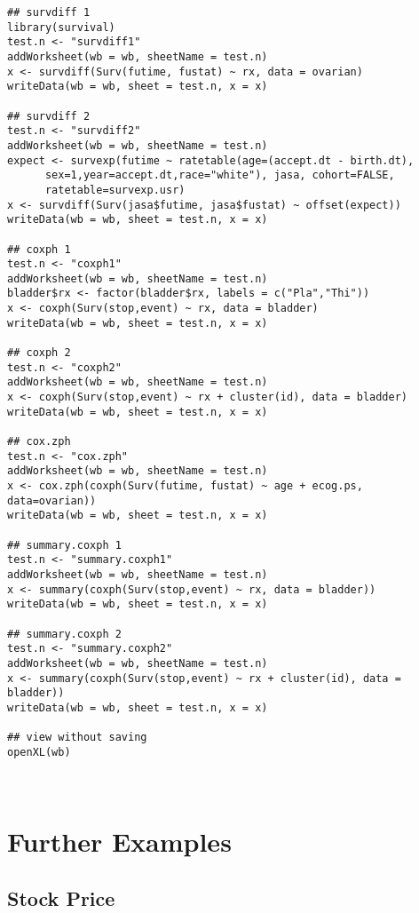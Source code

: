 \documentclass[11pt]{article}\usepackage[]{graphicx}\usepackage[]{color}
\begin{document}
\begin{verbatim}
## survdiff 1
library(survival)
test.n <- "survdiff1"
addWorksheet(wb = wb, sheetName = test.n)
x <- survdiff(Surv(futime, fustat) ~ rx, data = ovarian)
writeData(wb = wb, sheet = test.n, x = x)

## survdiff 2
test.n <- "survdiff2"
addWorksheet(wb = wb, sheetName = test.n)
expect <- survexp(futime ~ ratetable(age=(accept.dt - birth.dt),
      sex=1,year=accept.dt,race="white"), jasa, cohort=FALSE,
      ratetable=survexp.usr)
x <- survdiff(Surv(jasa$futime, jasa$fustat) ~ offset(expect))
writeData(wb = wb, sheet = test.n, x = x)

## coxph 1
test.n <- "coxph1"
addWorksheet(wb = wb, sheetName = test.n)
bladder$rx <- factor(bladder$rx, labels = c("Pla","Thi"))
x <- coxph(Surv(stop,event) ~ rx, data = bladder)
writeData(wb = wb, sheet = test.n, x = x)

## coxph 2
test.n <- "coxph2"
addWorksheet(wb = wb, sheetName = test.n)
x <- coxph(Surv(stop,event) ~ rx + cluster(id), data = bladder)
writeData(wb = wb, sheet = test.n, x = x)

## cox.zph
test.n <- "cox.zph"
addWorksheet(wb = wb, sheetName = test.n)
x <- cox.zph(coxph(Surv(futime, fustat) ~ age + ecog.ps,  data=ovarian))
writeData(wb = wb, sheet = test.n, x = x)

## summary.coxph 1
test.n <- "summary.coxph1"
addWorksheet(wb = wb, sheetName = test.n)
x <- summary(coxph(Surv(stop,event) ~ rx, data = bladder))
writeData(wb = wb, sheet = test.n, x = x)

## summary.coxph 2
test.n <- "summary.coxph2"
addWorksheet(wb = wb, sheetName = test.n)
x <- summary(coxph(Surv(stop,event) ~ rx + cluster(id), data = bladder))
writeData(wb = wb, sheet = test.n, x = x)

## view without saving
openXL(wb)



\end{verbatim}





\newpage
\section{Further Examples}

\subsection{Stock Price}
\end{document}

